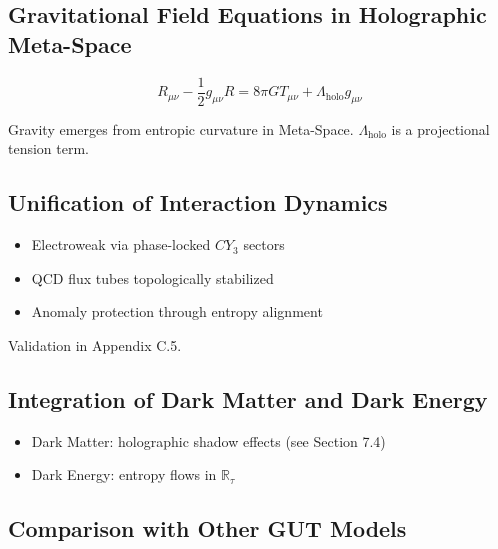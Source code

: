 \documentclass[10.5pt,a4paper]{article}
\begin{document}
\subsection{Gravitational Field Equations in Holographic Meta-Space}

\[
R_{\mu\nu} - \frac{1}{2} g_{\mu\nu} R = 8 \pi G T_{\mu\nu} + \Lambda_{\text{holo}} g_{\mu\nu}
\]

Gravity emerges from entropic curvature in Meta-Space. \(\Lambda_{\text{holo}}\) is a projectional tension term.

\subsection{Unification of Interaction Dynamics}

\begin{itemize}
    \item Electroweak via phase-locked \(CY_3\) sectors
    \item QCD flux tubes topologically stabilized
    \item Anomaly protection through entropy alignment
\end{itemize}

Validation in Appendix C.5.

\subsection{Integration of Dark Matter and Dark Energy}

\begin{itemize}
    \item Dark Matter: holographic shadow effects (see Section 7.4)
    \item Dark Energy: entropy flows in \(\mathbb{R}_\tau\)
\end{itemize}

\subsection{Comparison with Other GUT Models}

\keepXColumns %
\renewcommand{\arraystretch}{1.4}
\end{document}
